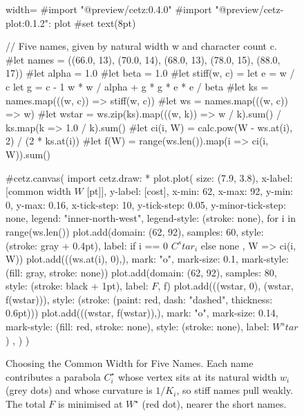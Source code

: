 \documentclass[10pt,twocolumn]{article}
\theoremstyle{plain}
\theoremstyle{definition}
\begin{document}
  \begin{figure}[t]
    \centering
    \begin{typst}{width=\columnwidth}
      #import "@preview/cetz:0.4.0"
      #import "@preview/cetz-plot:0.1.2": plot
      #set text(8pt)

      // Five names, given by natural width w and character count c.
      #let names = ((66.0, 13), (70.0, 14), (68.0, 13), (78.0, 15), (88.0, 17))
      #let alpha = 1.0
      #let beta = 1.0
      #let stiff(w, c) = {
      let e = w / c
      let g = c - 1
      w * w / alpha + g * g * e * e / beta
      }
      #let ks = names.map(((w, c)) => stiff(w, c))
      #let ws = names.map(((w, c)) => w)
      #let wstar = ws.zip(ks).map(((w, k)) => w / k).sum() / ks.map(k => 1.0 / k).sum()
      #let ci(i, W) = calc.pow(W - ws.at(i), 2) / (2 * ks.at(i))
      #let f(W) = range(ws.len()).map(i => ci(i, W)).sum()

      #cetz.canvas({
      import cetz.draw: *
      plot.plot(
      size: (7.9, 3.8),
      x-label: [common width $W$ [pt]], y-label: [cost],
      x-min: 62, x-max: 92, y-min: 0, y-max: 0.16,
      x-tick-step: 10, y-tick-step: 0.05, y-minor-tick-step: none,
      legend: "inner-north-west", legend-style: (stroke: none),
      {
          for i in range(ws.len()) {
              plot.add(domain: (62, 92), samples: 60, style: (stroke: gray + 0.4pt),
              label: if i == 0 { $C^star_i$ } else { none }, W => ci(i, W))
              plot.add(((ws.at(i), 0),), mark: "o", mark-size: 0.1,
              mark-style: (fill: gray, stroke: none))
            }
          plot.add(domain: (62, 92), samples: 80, style: (stroke: black + 1pt), label: $F$, f)
          plot.add(((wstar, 0), (wstar, f(wstar))),
          style: (stroke: (paint: red, dash: "dashed", thickness: 0.6pt)))
          plot.add(((wstar, f(wstar)),), mark: "o", mark-size: 0.14,
          mark-style: (fill: red, stroke: none), style: (stroke: none), label: $W^star$)
        },
      )
      })
    \end{typst}
    \caption{Choosing the Common Width for Five Names.
      Each name contributes a parabola $C^\star_i$ whose vertex sits at its
      natural width $w_i$ (grey dots) and whose curvature is $1/K_i$, so stiff
      names pull weakly.
      The total $F$ is minimised at $W^\star$ (red dot), nearer the short names.}
    \label{fig:width}
  \end{figure}
\end{document}
